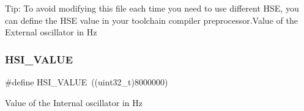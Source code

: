 Tip\+: To avoid modifying this file each time you need to use different H\+SE, you can define the H\+SE value in your toolchain compiler preprocessor.\+Value of the External oscillator in Hz \mbox{\label{group___library__configuration__section_gaaa8c76e274d0f6dd2cefb5d0b17fbc37}} 
\subsubsection{\texorpdfstring{HSI\_VALUE}{HSI\_VALUE}}
{\footnotesize\ttfamily \#define H\+S\+I\+\_\+\+V\+A\+L\+UE~((uint32\+\_\+t)8000000)}

Value of the Internal oscillator in Hz 